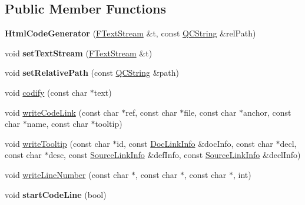 \subsection*{Public Member Functions}
\begin{DoxyCompactItemize}
\item 
\mbox{\label{class_html_code_generator_a56e49ef654ba100c1d218aa99a881fe8}} 
{\bfseries Html\+Code\+Generator} (\mbox{\hyperlink{class_f_text_stream}{F\+Text\+Stream}} \&t, const \mbox{\hyperlink{class_q_c_string}{Q\+C\+String}} \&rel\+Path)
\item 
\mbox{\label{class_html_code_generator_a9b5bfa3e5431129fb292ccde2cabcfe8}} 
void {\bfseries set\+Text\+Stream} (\mbox{\hyperlink{class_f_text_stream}{F\+Text\+Stream}} \&t)
\item 
\mbox{\label{class_html_code_generator_a9bc120e267a5830b05030cf6c74a3d41}} 
void {\bfseries set\+Relative\+Path} (const \mbox{\hyperlink{class_q_c_string}{Q\+C\+String}} \&path)
\item 
void \mbox{\hyperlink{class_html_code_generator_aa482ae62b65a2fd1cc6cda022e88c920}{codify}} (const char $\ast$text)
\item 
void \mbox{\hyperlink{class_html_code_generator_a5098b373d91b9674cc399132a321f040}{write\+Code\+Link}} (const char $\ast$ref, const char $\ast$file, const char $\ast$anchor, const char $\ast$name, const char $\ast$tooltip)
\item 
void \mbox{\hyperlink{class_html_code_generator_a6edc5ab4a379a6edfaac4e4c36db4178}{write\+Tooltip}} (const char $\ast$id, const \mbox{\hyperlink{struct_doc_link_info}{Doc\+Link\+Info}} \&doc\+Info, const char $\ast$decl, const char $\ast$desc, const \mbox{\hyperlink{struct_source_link_info}{Source\+Link\+Info}} \&def\+Info, const \mbox{\hyperlink{struct_source_link_info}{Source\+Link\+Info}} \&decl\+Info)
\item 
void \mbox{\hyperlink{class_html_code_generator_a926369daa75db9967dc5c6f818b5b406}{write\+Line\+Number}} (const char $\ast$, const char $\ast$, const char $\ast$, int)
\item 
\mbox{\label{class_html_code_generator_afbc2414a5387b977150b015dfbd16c10}} 
void {\bfseries start\+Code\+Line} (bool)
\item 

\end{DoxyCompactItemize}
